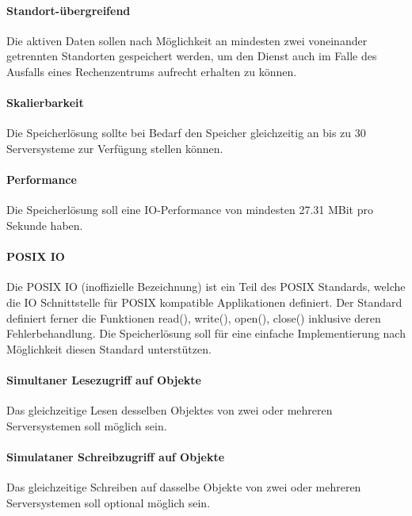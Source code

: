 \paragraph{Standort-übergreifend}\label{Soll-2-3}
Die aktiven Daten sollen nach Möglichkeit an mindesten zwei voneinander getrennten Standorten gespeichert werden, um den Dienst auch im Falle des Ausfalls eines Rechenzentrums aufrecht erhalten zu können.

\setcounter{paragraph}{0}
\renewcommand\theparagraph{Soll-3-\arabic{paragraph}}

\paragraph{Skalierbarkeit}\label{Soll-3-1}
Die Speicherlösung sollte bei Bedarf den Speicher gleichzeitig an bis zu 30 Serversysteme zur Verfügung stellen können.

\paragraph{Performance}\label{Soll-3-2}
Die Speicherlösung soll eine IO-Performance von mindesten 27.31 MBit pro Sekunde haben.

\paragraph{POSIX IO}\label{Soll-3-3}
Die POSIX IO (inoffizielle Bezeichnung) ist ein Teil des POSIX Standards, welche die IO Schnittstelle für POSIX kompatible Applikationen definiert. Der Standard definiert ferner die Funktionen read(), write(), open(), close() inklusive deren Fehlerbehandlung. Die Speicherlösung soll für eine einfache Implementierung nach Möglichkeit diesen Standard unterstützen. 

\paragraph{Simultaner Lesezugriff auf Objekte}\label{Soll-3-4}
Das gleichzeitige Lesen desselben Objektes von zwei oder mehreren Serversystemen soll möglich sein.

\paragraph{Simulataner Schreibzugriff auf Objekte}\label{Soll-3-5}
Das gleichzeitige Schreiben auf dasselbe Objekte von zwei oder mehreren Serversystemen soll optional möglich sein.

